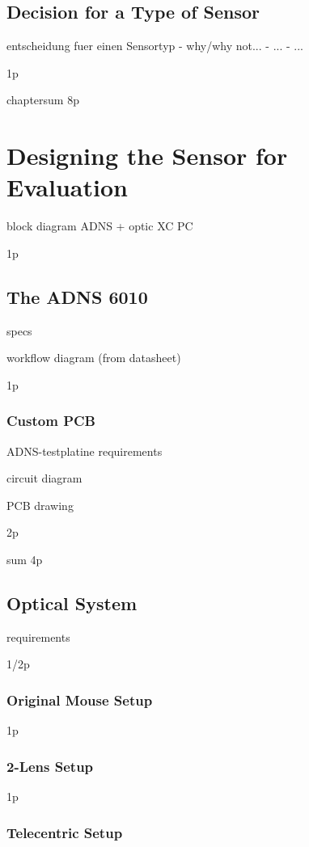 \documentclass[12pt,a4paper]{article}
\begin{document}
\subsection{Decision for a Type of Sensor}
  entscheidung fuer einen Sensortyp
    - why/why not...
    - ...
    - ...

1p


chaptersum 8p

\section{Designing the Sensor for Evaluation}

block diagram
  ADNS + optic
  XC
  PC

1p

\subsection{The ADNS 6010}

specs

workflow diagram (from datasheet)

1p

\subsubsection{Custom PCB}
ADNS-testplatine
  requirements

  circuit diagram

  PCB drawing

2p

sum 4p
  
\subsection{Optical System}
  requirements

1/2p

\subsubsection{Original Mouse Setup}

1p

\subsubsection{2-Lens Setup}

1p

\subsubsection{Telecentric Setup}
\end{document}
